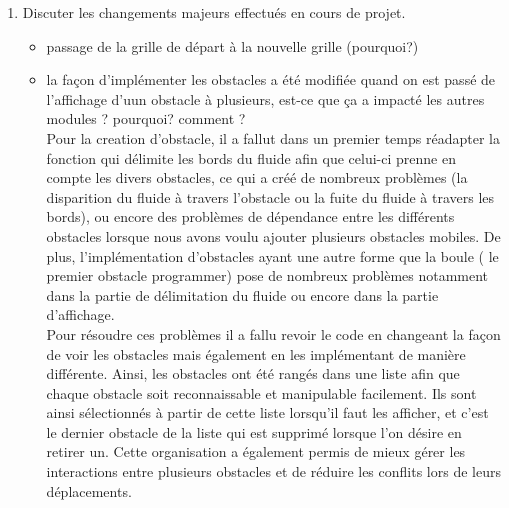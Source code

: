\documentclass[a4paper]{article}
\begin{document}
\begin{enumerate}
\begin{itemize}
    \item branches github, commits \\
    {\color{WildStrawberry} Pour la mise en place d'un travail d'équipe
        optimale, nous avons utilisé GitHub. Lorsque nous travaillions ensemble, 
        nous nous placions sur la branche main afin que chacun puisse accéder 
        à ce que les autres ont fait facilement, puis lorsque nous avons choisi 
        de nous repartir les taches nous nous sommes tous mis à
        travailler sur des branches différentes (Gaelle, Satine, Axel,Saurane)
        afin de pouvoir travailler et enregistrer notre travaille
        sans risquer de causer des conflits ou d'enregistrer quelque chose qui ne fonctionne pas.
        Une fois notre programme complet nous le mettions alors sur le main afin que tout le monde puisse y accéder.
        Nous avons également veillé à faire des commit réguliers et descriptifs 
        pour suivre l'évolution du projet et faciliter la collaboration.
    }
\end{itemize}
\item	Discuter les changements majeurs effectués en cours de projet. 
\begin{itemize}
\item passage de la grille de départ à la nouvelle grille (pourquoi?)
\item la façon d'implémenter les obstacles a été modifiée quand on est passé de l'affichage d'uun obstacle à plusieurs, est-ce
    que ça a impacté les autres modules ? pourquoi? comment ?\\
    {\color{WildStrawberry} 
      Pour la creation d'obstacle, il a fallut dans un premier temps réadapter la fonction
        qui délimite les bords du fluide afin que celui-ci prenne en compte les divers obstacles,
        ce qui a créé de nombreux problèmes (la disparition du fluide à travers l'obstacle
        ou la fuite du fluide à travers les bords), ou encore des problèmes de dépendance entre
        les différents obstacles lorsque nous avons voulu ajouter plusieurs obstacles mobiles.
        De plus, l'implémentation d'obstacles ayant une autre forme que la boule ( le premier obstacle programmer)
        pose de nombreux problèmes notamment dans la partie de délimitation du fluide 
        ou encore dans la partie d'affichage.\\

        Pour résoudre ces problèmes il a fallu revoir le code en changeant la façon de voir
        les obstacles mais également en les implémentant de manière différente.
        Ainsi, les obstacles ont été rangés dans une liste afin que chaque obstacle
        soit reconnaissable et manipulable facilement. Ils sont ainsi sélectionnés à partir
        de cette liste lorsqu'il faut les afficher, et c'est le dernier obstacle de la liste
        qui est supprimé lorsque l'on désire en retirer un. Cette organisation a également permis
        de mieux gérer les interactions entre plusieurs obstacles et de réduire les conflits
        lors de leurs déplacements.\\

}
\end{itemize}
\end{enumerate}
\end{document}
